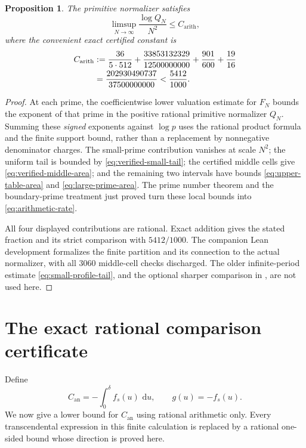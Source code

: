\documentclass[11pt,letterpaper]{article}
\newtheorem{proposition}[proposition]{Proposition}
\theoremstyle{definition}
\newcommand{\dd}{\,\mathrm d}
\newcommand{\arith}{\mathrm{arith}}
\newcommand{\an}{\mathrm{an}}
\begin{document}
\begin{proposition}\label{prop:arithmetic-rate}
The primitive normalizer satisfies
\begin{equation}\label{eq:arithmetic-rate}
 \limsup_{N\to\infty}\frac{\log Q_N}{N^2}\le C_{\arith},
\end{equation}
where the convenient exact certified constant is
\begin{align}
 C_{\arith}
 &:={\frac{36}{5\cdot512}}
     +{\frac{33853132329}{12500000000}}
     +{\frac{901}{600}}+{\frac{19}{16}}\notag\\
 &=\frac{202930490737}{37500000000}
 <\frac{5412}{1000}.
 \label{eq:arithmetic-exact}
\end{align}
\end{proposition}
\begin{proof}
At each prime, the coefficientwise lower valuation estimate for
$F_N$ bounds the exponent of that prime in the positive rational
primitive normalizer $Q_N$. Summing these \emph{signed} exponents
against $\log p$ uses the rational product formula and the finite
support bound, rather than a replacement by nonnegative denominator charges.
The small-prime contribution vanishes at scale $N^2$; the uniform
tail is bounded by \eqref{eq:verified-small-tail}; the certified middle
cells give \eqref{eq:verified-middle-area}; and the remaining two
intervals have bounds \eqref{eq:upper-table-area} and
\eqref{eq:large-prime-area}. The prime number theorem and the
boundary-prime treatment just proved turn these local bounds into
\eqref{eq:arithmetic-rate}.

All four displayed contributions are rational. Exact addition gives
the stated fraction and its strict comparison with $5412/1000$.
The companion Lean development formalizes the finite partition and
its connection to the actual normalizer, with all 3060 middle-cell
checks discharged. The older infinite-period estimate
\eqref{eq:small-profile-tail}, and the optional sharper comparison
in , are not used here.
\end{proof}


\section{The exact rational comparison certificate}\label{sec:certificate}

Define
\[
 C_{\an}=-\int_0^\delta f_s(u)\,\dd u,\qquad g(u)=-f_s(u).
\]
We now give a lower bound for $C_{\an}$ using rational arithmetic only.
Every transcendental expression in this finite calculation is replaced by
a rational one-sided bound whose direction is proved here.
\end{document}
